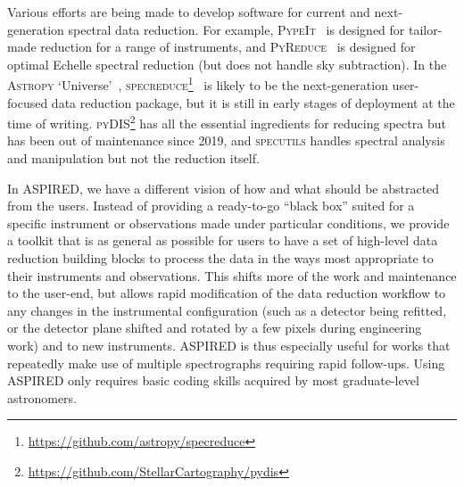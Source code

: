 \documentclass[linenumbers, twocolumn]{aastex631}
\begin{document}
Various efforts are being made to develop software for current and
next-generation spectral data reduction. For example,
\textsc{PypeIt}~\citep{pypeit:zenodo, 2020JOSS....5.2308P} is designed for
tailor-made reduction for a range of instruments, and
\textsc{PyReduce}~\citep{2021A&A...646A..32P} is designed for optimal Echelle
spectral reduction (but does not handle sky subtraction). In the \textsc{Astropy}
`Universe'~\citep{astropy:2013, astropy:2018},
\textsc{specreduce}\footnote{\url{https://github.com/astropy/specreduce}}~\citep{pickering_timothy_2022_7007991} is likely to be the
next-generation user-focused data reduction package, but it is still in early
stages of deployment at the time of writing.
\textsc{pyDIS}\footnote{\url{https://github.com/StellarCartography/pydis}} has
all the essential ingredients for reducing spectra but has been out of
maintenance since 2019, and \textsc{specutils}
handles spectral analysis and manipulation but not the reduction itself.

In \textsc{ASPIRED}, we have a different vision of how and what should be
abstracted from the users. Instead of providing a ready-to-go ``black box''
suited for a specific instrument or observations made under particular conditions,
we provide a toolkit that is as general as possible for users to have a set of
high-level data reduction building blocks to process the data in the ways most
appropriate to their instruments and observations. This shifts more of the work
and maintenance to the user-end, but allows rapid modification of the
data reduction workflow to any changes in the instrumental
configuration (such as a detector being refitted, or the detector plane
shifted and rotated by a few pixels during engineering work) and to new instruments. \textsc{ASPIRED}
is thus especially useful for works that repeatedly make use of multiple
spectrographs requiring rapid follow-ups.
Using \textsc{ASPIRED} only requires basic coding skills acquired by most
graduate-level astronomers.
\end{document}

